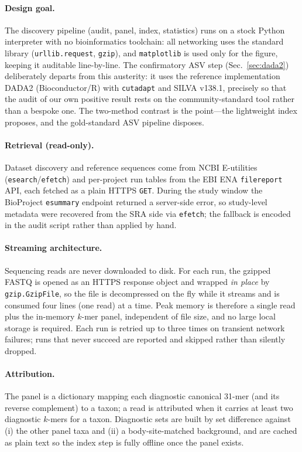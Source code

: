 \documentclass[11pt]{article}
\begin{document}
\paragraph{Design goal.} The discovery pipeline (audit, panel, index, statistics)
runs on a stock Python interpreter with no bioinformatics toolchain: all
networking uses the standard library (\texttt{urllib.request}, \texttt{gzip}),
and \texttt{matplotlib} is used only for the figure, keeping it auditable
line-by-line. The confirmatory ASV step (Sec.~\ref{sec:dada2}) deliberately
departs from this austerity: it uses the reference implementation DADA2
(Bioconductor/R) with \texttt{cutadapt} and SILVA v138.1, precisely so that the
audit of our own positive result rests on the community-standard tool rather than
a bespoke one. The two-method contrast is the point---the lightweight index
proposes, and the gold-standard ASV pipeline disposes.

\paragraph{Retrieval (read-only).} Dataset discovery and reference sequences come
from NCBI E-utilities (\texttt{esearch}/\texttt{efetch}) and per-project run
tables from the EBI ENA \texttt{filereport} API, each fetched as a plain HTTPS
\texttt{GET}. During the study window the BioProject \texttt{esummary} endpoint
returned a server-side error, so study-level metadata were recovered from the SRA
side via \texttt{efetch}; the fallback is encoded in the audit script rather than
applied by hand.

\paragraph{Streaming architecture.} Sequencing reads are never downloaded to
disk. For each run, the gzipped FASTQ is opened as an HTTPS response object and
wrapped \emph{in place} by \texttt{gzip.GzipFile}, so the file is decompressed
on the fly while it streams and is consumed four lines (one read) at a time. Peak
memory is therefore a single read plus the in-memory $k$-mer panel, independent
of file size, and no large local storage is required. Each run is retried up to
three times on transient network failures; runs that never succeed are reported
and skipped rather than silently dropped.

\paragraph{Attribution.} The panel is a dictionary mapping each diagnostic
canonical 31-mer (and its reverse complement) to a taxon; a read is attributed
when it carries at least two diagnostic $k$-mers for a taxon. Diagnostic sets are
built by set difference against (i) the other panel taxa and (ii) a
body-site-matched background, and are cached as plain text so the index step is
fully offline once the panel exists.
\end{document}
